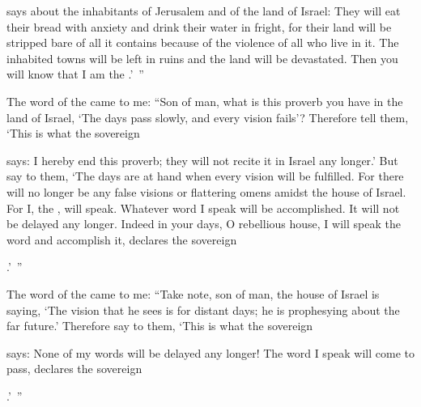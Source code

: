 {{}
says
about the inhabitants
of Jerusalem
and of the land
of Israel: They will eat
their bread
with anxiety
and drink
their water
in fright,
for
their land
will be stripped
bare of all it contains
because of the violence
of all
who live in it.
The inhabited
towns
will be
left in ruins
and the land
will be devastated.
Then you will know
that
I am
the {}.’ ”
\par }{\PP {}The word
of the {}
came to me:
“Son
of man,
what
is this
proverb
you have in
the land
of Israel,
‘The days
pass slowly,
and every
vision
fails’?
Therefore
tell
them,
‘This is what
the sovereign

{}
says: I hereby end
this
proverb;
they will not
recite
it in Israel
any longer.’
But
say
to them,
‘The days
are at hand when every
vision
will be fulfilled.
For
there will no
longer
be any
false
visions
or flattering
omens
amidst
the house
of Israel.
For
I,
the {}, will speak.
Whatever
word
I speak
will be accomplished. It
will not
be delayed
any longer.
Indeed
in your days,
O
rebellious
house,
I will speak
the word
and accomplish it,
declares
the sovereign

{}.’ ”
\par }{\PP {}The word
of the {}
came to me:
“Take note, son
of man,
the house
of Israel
is saying,
‘The vision
that
he sees
is for distant
days;
he is
prophesying about the far future.’
Therefore
say
to
them, ‘This is what
the sovereign

{}
says: None
of my words
will be delayed
any
longer! The word
I speak
will come to pass, declares
the sovereign

{}.’ ”

\par }
